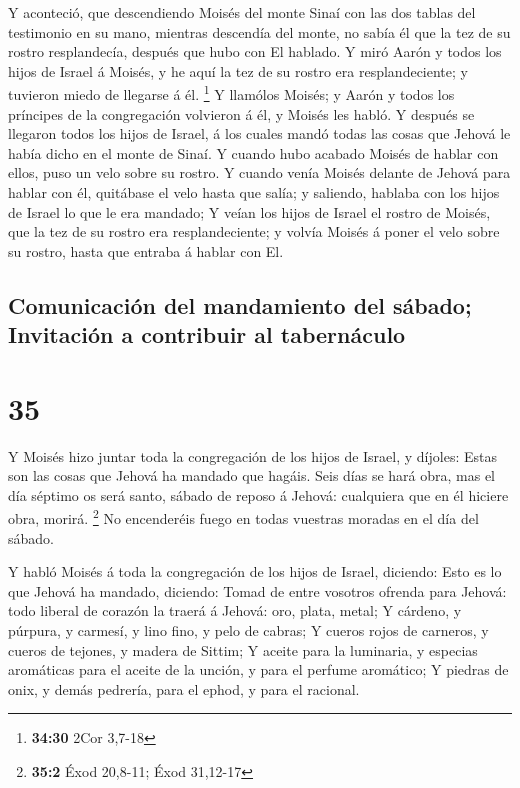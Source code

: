  Y aconteció, que descendiendo Moisés del monte Sinaí con
las dos tablas del testimonio en su mano, mientras descendía del monte,
no sabía él que la tez de su rostro resplandecía, después que hubo con
El hablado.  Y miró Aarón y todos los hijos de Israel á
Moisés, y he aquí la tez de su rostro era resplandeciente; y tuvieron
miedo de llegarse á él. \footnote{\textbf{34:30} 2Cor 3,7-18}
 Y llamólos Moisés; y Aarón y todos los príncipes de la
congregación volvieron á él, y Moisés les habló.  Y
después se llegaron todos los hijos de Israel, á los cuales mandó todas
las cosas que Jehová le había dicho en el monte de Sinaí.
 Y cuando hubo acabado Moisés de hablar con ellos, puso
un velo sobre su rostro.  Y cuando venía Moisés delante
de Jehová para hablar con él, quitábase el velo hasta que salía; y
saliendo, hablaba con los hijos de Israel lo que le era mandado;
 Y veían los hijos de Israel el rostro de Moisés, que la
tez de su rostro era resplandeciente; y volvía Moisés á poner el velo
sobre su rostro, hasta que entraba á hablar con El.

\hypertarget{comunicaciuxf3n-del-mandamiento-del-suxe1bado-invitaciuxf3n-a-contribuir-al-tabernuxe1culo}{%
\subsection{Comunicación del mandamiento del sábado; Invitación a
contribuir al
tabernáculo}\label{comunicaciuxf3n-del-mandamiento-del-suxe1bado-invitaciuxf3n-a-contribuir-al-tabernuxe1culo}}

\hypertarget{section-34}{%
\section{35}\label{section-34}}

 Y Moisés hizo juntar toda la congregación de los hijos de
Israel, y díjoles: Estas son las cosas que Jehová ha mandado que hagáis.
 Seis días se hará obra, mas el día séptimo os será santo,
sábado de reposo á Jehová: cualquiera que en él hiciere obra, morirá.
\footnote{\textbf{35:2} Éxod 20,8-11; Éxod 31,12-17}  No
encenderéis fuego en todas vuestras moradas en el día del sábado.

 Y habló Moisés á toda la congregación de los hijos de
Israel, diciendo: Esto es lo que Jehová ha mandado, diciendo:
 Tomad de entre vosotros ofrenda para Jehová: todo liberal
de corazón la traerá á Jehová: oro, plata, metal;  Y
cárdeno, y púrpura, y carmesí, y lino fino, y pelo de cabras;
 Y cueros rojos de carneros, y cueros de tejones, y madera
de Sittim;  Y aceite para la luminaria, y especias
aromáticas para el aceite de la unción, y para el perfume aromático;
 Y piedras de onix, y demás pedrería, para el ephod, y
para el racional.

